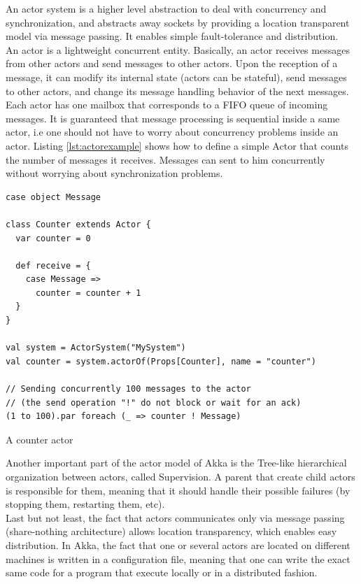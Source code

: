 An actor system is a higher level abstraction to deal with concurrency and synchronization, and abstracts away sockets by providing a location transparent model
via message passing. It enables simple fault-tolerance and distribution.
\\

An actor is a lightweight concurrent entity. Basically, an actor receives messages from other actors and send messages to other actors. Upon the reception of 
a message, it can modify its internal state (actors can be stateful), send messages to other actors, and change its message handling behavior of the next messages.
Each actor has one mailbox that corresponds to a FIFO queue of incoming messages.
It is guaranteed that message processing is sequential inside a same actor, i.e one should not have to worry about concurrency problems inside an actor. Listing
\ref{lst:actorexample} shows how to define a simple Actor that counts the number of messages it receives. Messages can sent to him concurrently without worrying
about synchronization problems.

\begin{listing}[h]
\begin{verbatim}
case object Message

class Counter extends Actor {
  var counter = 0

  def receive = {
    case Message => 
      counter = counter + 1
  }
}

val system = ActorSystem("MySystem")
val counter = system.actorOf(Props[Counter], name = "counter")

// Sending concurrently 100 messages to the actor 
// (the send operation "!" do not block or wait for an ack)
(1 to 100).par foreach (_ => counter ! Message)
\end{verbatim}
\caption{A counter actor}
\label{lst:actorexample}
\end{listing}

Another important part of the actor model of Akka is the Tree-like hierarchical organization between actors, called Supervision.
A parent that create child actors is responsible for them, meaning that it should handle their possible failures (by stopping them,
restarting them, etc).
\\

Last but not least, the fact that actors communicates only via message passing (share-nothing architecture) allows location transparency, which
enables easy distribution. In Akka, the fact that one or several actors are located on different machines is written in a configuration file, meaning that
one can write the exact same code for a program that execute locally or in a distributed fashion.

